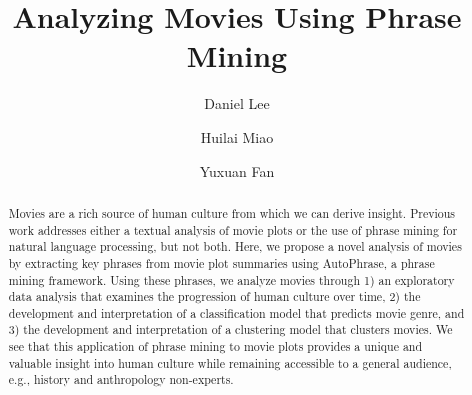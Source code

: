 \documentclass{article}
\title{Analyzing Movies Using Phrase Mining}
\author{Daniel Lee \and Huilai Miao \and Yuxuan Fan}
\begin{document}
\maketitle

\begin{abstract} %
Movies are a rich source of human culture from which we can derive insight. Previous work addresses either a textual analysis of movie plots or the use of phrase mining for natural language processing, but not both. Here, we propose a novel analysis of movies by extracting key phrases from movie plot summaries using AutoPhrase, a phrase mining framework. Using these phrases, we analyze movies through 1) an exploratory data analysis that examines the progression of human culture over time, 2) the development and interpretation of a classification model that predicts movie genre, and 3) the development and interpretation of a clustering model that clusters movies. We see that this application of phrase mining to movie plots provides a unique and valuable insight into human culture while remaining accessible to a general audience, e.g., history and anthropology non-experts.
\end{abstract}
\end{document}
